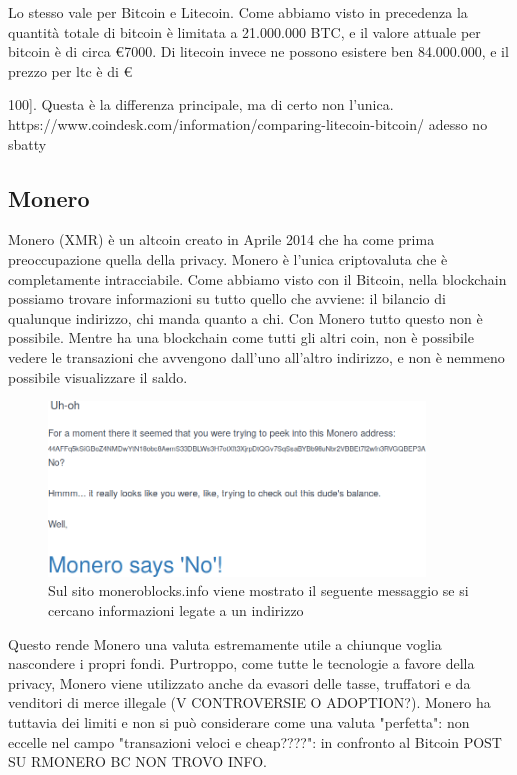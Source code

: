 \documentclass {article}
\begin{document}
Lo stesso vale per Bitcoin e Litecoin. Come abbiamo visto in precedenza la quantità totale di bitcoin è limitata a 21.000.000 BTC, e il valore attuale per bitcoin è di circa \euro{7000}. Di litecoin invece ne possono esistere ben 84.000.000, e il prezzo per ltc è di \euro{100].
Questa è la differenza principale, ma di certo non l'unica.
https://www.coindesk.com/information/comparing-litecoin-bitcoin/ adesso no sbatty


\subsection {Monero}


Monero (XMR) è un altcoin creato in Aprile 2014 che ha come prima preoccupazione quella della privacy.
Monero è l'unica criptovaluta che è completamente intracciabile. Come abbiamo visto con il Bitcoin, nella blockchain possiamo trovare informazioni su tutto quello che avviene: il bilancio di qualunque indirizzo, chi manda quanto a chi.
Con Monero tutto questo non è possibile. Mentre ha una blockchain come tutti gli altri coin, non è possibile vedere le transazioni che avvengono dall'uno all'altro indirizzo, e non è nemmeno possibile visualizzare il saldo.

\vspace {0.5cm}
\begin {figure}[h]
\includegraphics [width = 10cm] {media/monero.png}
\caption {Sul sito moneroblocks.info viene mostrato il seguente messaggio se si cercano informazioni legate a un indirizzo}
\end {figure}
\vspace {0.5cm}

Questo rende Monero una valuta estremamente utile a chiunque voglia nascondere i propri fondi.
Purtroppo, come tutte le tecnologie a favore della privacy, Monero viene utilizzato anche da evasori delle tasse, truffatori e da venditori di merce illegale (V CONTROVERSIE O ADOPTION?).
Monero ha tuttavia dei limiti e non si può considerare come una valuta "perfetta": non eccelle nel campo "transazioni veloci e cheap????": in confronto al Bitcoin POST SU RMONERO BC NON TROVO INFO.


}
\end{document}
